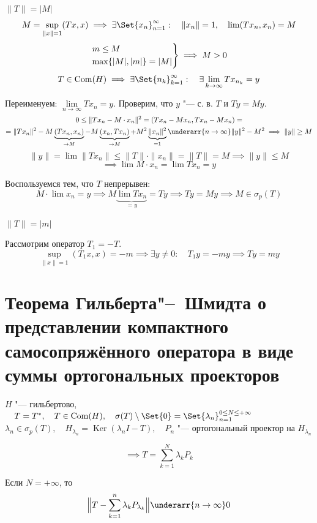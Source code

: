 \begin{iproof}
\item $ \|T\| = |M| $
	$$ M = \sup\limits_{\|x\| = 1}(Tx, x) \implies \exists \Set{x_n}_{n = 1}^\infty : \quad
	\|x_n\| = 1, \quad \lim(Tx_n, x_n) = M $$
	$$
	\begin{rcases}
		m \le M \\
		\max\{|M|, |m|\} = |M|
	\end{rcases} \implies M > 0 $$
	$$ T \in \mathrm{Com}(H) \implies \exists \Set{n_k}_{k = 1}^\infty : \quad
	\exists \lim\limits_{k \to \infty} Tx_{n_k} = y $$

	Переименуем: $ \lim\limits_{n \to \infty} Tx_n = y $.
	Проверим, что $ y $ "--- с. в. $ T $ и $ Ty = My $.
	\begin{multline*}
		0 \le \|Tx_n - M \cdot x_n \|^2 = (Tx_n - Mx_n, Tx_n - Mx_n) = \\
		= \|Tx_n\|^2 - M \underbrace{(Tx_n, x_n)}_{\to M} - M \underbrace{(x_n, Tx_n)}_{\to M} +
		M^2 \underbrace{\|x_n\|^2}_{= 1} \underarr{n \to \infty} \|y\|^2 - M^2 \implies
		\|y\| \ge M
	\end{multline*}
	$$ \|y\| = \lim \|Tx_n\| \le \|T\| \cdot \|x_n\| = \|T\| = M \implies \|y\| \le M $$
	$$ \implies \lim M \cdot x_n = \lim Tx_n = y $$

	Воспользуемся тем, что $ T $ непрерывен:
	$$ M \cdot \lim x_n = y \implies M \underbrace{\lim Tx_n}_{= y} = Ty \implies
	Ty = My \implies M \in \sigma_p(T) $$

\item $ \|T\| = |m| $

	Рассмотрим оператор $ T_1 = -T $.
	$$ \sup\limits_{\|x\| = 1} (T_1x, x) = -m \implies \exists y \ne 0 : \quad T_1y = -my \implies
	Ty = my $$
\end{iproof}

\section{Теорема Гильберта\texorpdfstring{"--~}{--}Шмидта о представлении компактного
самосопряжённого оператора в виде суммы ортогональных проекторов}

\begin{theorem}
	$ H $ "--- гильбертово, $ \quad T = T^*, \quad T \in \mathrm{Com}(H),
	\quad \sigma (T) \setminus \Set{0} = \Set{\lambda_n}_{n = 1}^{0 \le N \le +\infty} $ \\
	$ \lambda_n \in \sigma_p(T), \quad H_{\lambda_n} = \operatorname{Ker}(\lambda_n I - T),
	\quad P_n $ "--- ортогональный проектор на $ H_{\lambda_n} $

	$$ \implies T = \sum_{k = 1}^N \lambda_k P_k $$

	Если $ N = +\infty $, то
	$$ \Bigl\|T - \sum_{k = 1}^n \lambda_k P_{\lambda_k}\Bigr\| \underarr{n \to \infty} 0 $$
\end{theorem}

